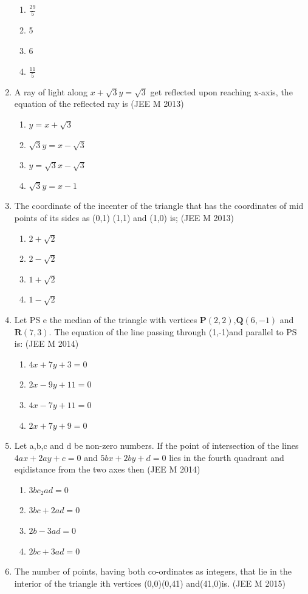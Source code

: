 \documentclass[12pt]{article}
\let\vec\mathbf
\begin{document}
\begin{enumerate}
\begin{enumerate}
\item $\frac{29}{5}$ 
\item 5 
\item 6 
\item $\frac{11}{5}$
\end{enumerate}
\item A ray of light along $x+\sqrt{3}y=\sqrt{3}$ get reflected upon reaching x-axis, the equation of the reflected ray is (JEE M 2013)
\begin{enumerate}
\item $y=x+\sqrt{3}$ 
\item $\sqrt{3}y=x-\sqrt{3}$ 
\item $y=\sqrt{3}x-\sqrt{3}$ 
\item $\sqrt{3}y=x-1$ 
\end{enumerate}
\item The coordinate of the incenter of the triangle that has the coordinates of mid points of its sides as (0,1) (1,1) and (1,0) is; (JEE M 2013)
\begin{enumerate}
\item $2+\sqrt{2}$
\item $2-\sqrt{2}$ 
\item $1+\sqrt{2}$ 
\item $1-\sqrt{2}$
\end{enumerate}
\item Let PS e the median of the triangle with vertices $\vec{P}(2,2)$,$\vec{Q}(6,-1)$ and $\vec{R}(7,3)$. The equation of the line passing through (1,-1)and parallel to PS is: (JEE M 2014)
\begin{enumerate}
\item $4x+7y+3=0$ 
\item $2x-9y+11=0$ 
\item $4x-7y+11=0$ 
\item $2x+7y+9=0$ 
\end{enumerate}
\item Let a,b,c and d be non-zero numbers. If the point of intersection of the lines $4ax+2ay+c=0$ and $5bx+2by+d=0$ lies in the fourth quadrant and eqidistance from the two axes then (JEE M 2014)
\begin{enumerate}
\item $3bc_2ad=0$  
\item $3bc+2ad=0$
\item $2b-3ad=0$ 
\item $2bc+3ad=0$
\end{enumerate}
\item The number of points, having both co-ordinates as integers, that lie in the interior of the triangle ith vertices (0,0)(0,41) and(41,0)is. (JEE M 2015)

\end{enumerate}
\end{document}
